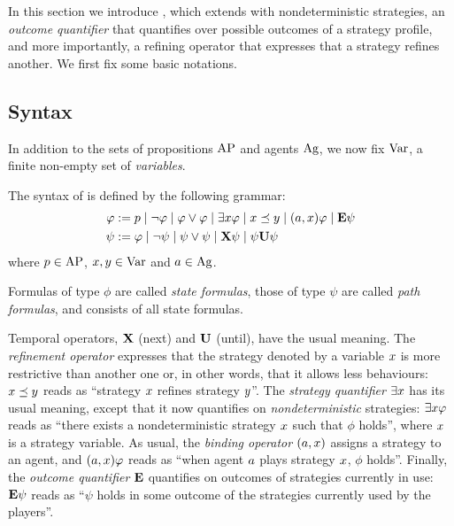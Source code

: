
In this section we introduce \SLref, which extends \SL 
with nondeterministic strategies,  an \emph{outcome quantifier} that
quantifies over possible outcomes of a strategy profile,
and more importantly, a refining operator that expresses that a
strategy refines another.
We first fix some basic notations.



 \subsection{Syntax}
 \label{sec-SL-definition}

In addition to the sets of propositions $\textnormal{AP}$ and agents $\textnormal{Ag}$, we
now fix $\textnormal{Var}$, a finite non-empty set of \emph{variables}.



\begin{definition}%
  \label{def-SLi}
    The syntax of \SLref is defined by the following grammar:
    \begin{align*}
  \varphi:= &\; p 
  \mid \neg \varphi 
  \mid \varphi\vee\varphi 
               \mid \exists x \varphi
               \mid x \preceq y
               \mid (a,x)\varphi
  \mid {\bf E}\psi               
      \\
      \psi:= &\; \varphi
                   \mid \neg \psi
                   \mid \psi\vee \psi
                   \mid {\bf X} \psi
                   \mid  \psi {\bf U} \psi
    \end{align*}
     where 
  $p\in\textnormal{AP}$, $x,y\in\textnormal{Var}$ and $a\in\textnormal{Ag}$.
\end{definition}

Formulas of type $\phi$ are called \emph{state formulas}, those of type $\psi$
are called \emph{path formulas}, and \SLref consists of all state formulas.


Temporal operators, ${\bf X}$ (next) and
 ${\bf U}$ (until), have the usual meaning. The \emph{refinement
   operator} expresses that the strategy denoted by a variable $x$ is more
 restrictive than another one or, in other words, that it allows less behaviours: $x\preceq y$ reads as ``strategy
 $x$ refines strategy $y$''. The  \emph{strategy
   quantifier}  $\exists x$  has its usual meaning, except that it now
 quantifies on \emph{nondeterministic}
 strategies: $\exists x\varphi$
 reads as ``there exists a nondeterministic
 strategy $x$
  such that $\phi$
 holds'', where $x$ is a strategy variable. 
As usual, the \emph{binding operator} $(a,x)$ assigns a strategy to an
 agent, and $(a,x)\varphi$ reads as ``when agent $a$ plays strategy $x$,
 $\phi$ holds''.
Finally, the \emph{outcome quantifier} ${\bf E}$ quantifies on
   outcomes of strategies currently in use: ${\bf E}\psi$ reads as ``$\psi$
 holds in some
 outcome of the strategies currently used by the players''.

